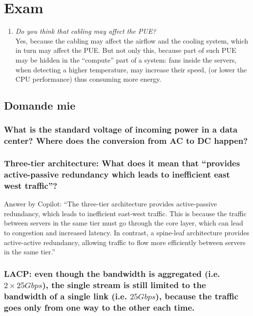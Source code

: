 \chapter{Exam}

\begin{enumerate}
   \item 
   \textit{Do you think that cabling may affect the PUE?}\\
   Yes, because the cabling may affect the airflow and the cooling system, which in turn may affect the PUE.
   But not only this, because part of such PUE may be hidden in the ``compute'' part of a system:
   fans inside the servers, when detecting a higher temperature, may increase their speed, (or lower the CPU performance) thus consuming more energy.
\end{enumerate}


\section{Domande mie}

\subsection{What is the standard voltage of incoming power in a data center? Where does the conversion from AC to DC happen?}

\subsection{Three-tier architecture: What does it mean that ``provides active-passive redundancy which leads to inefficient east west traffic''?}

Answer by Copilot: 
``The three-tier architecture provides active-passive redundancy, which leads to inefficient east-west traffic. This is because the traffic between servers in the same tier must go through the core layer, which can lead to congestion and increased latency. In contrast, a spine-leaf architecture provides active-active redundancy, allowing traffic to flow more efficiently between servers in the same tier.'' 
   

\subsection{LACP: even though the bandwidth is aggregated (i.e. $2\times 25Gbps$), the single stream is still limited to the bandwidth of a single link (i.e. $25Gbps$), because the traffic goes only from one way to the other each time.}

